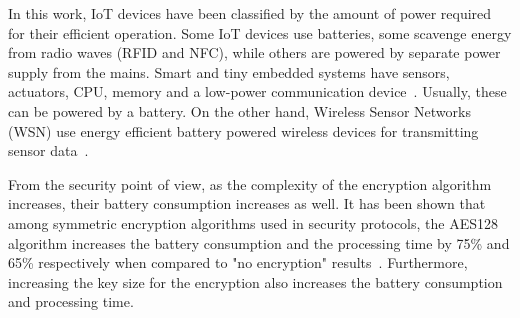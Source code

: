 \documentclass{siamltex}
\begin{document}
In this work, IoT devices have been classified by the amount of power required
for their efficient operation. Some IoT devices use batteries, some scavenge
energy from radio waves (RFID and NFC), while others are powered by separate
power supply from the mains.  Smart and tiny embedded systems
have sensors, actuators, CPU, memory and a low-power communication
device~\cite{lopez2012adding}. Usually, these can be powered by a battery. On
the other hand, Wireless Sensor Networks (WSN)
use energy efficient battery powered wireless devices for transmitting
sensor data~\cite{akyildiz2002wireless}.

From the security point of view, as the complexity of the encryption algorithm
increases, their battery consumption increases as well. It has been shown that
among symmetric encryption algorithms used in security protocols, the AES128 algorithm
increases the battery consumption and the processing time by 75\% and 65\%
respectively when compared to "no encryption" results~\cite{hamad2009energy}.
Furthermore, increasing the key size for the encryption also increases the
battery consumption and processing time.




\end{document}
